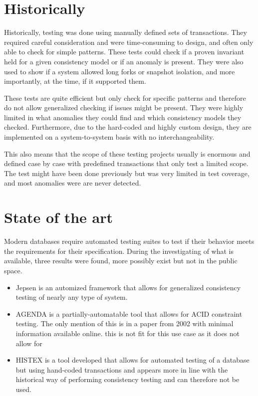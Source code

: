 \documentclass[a4paper,10pt,titlepage]{report}
\begin{document}
\section{Historically}

Historically, testing was done using manually defined sets of transactions. They required careful consideration and were time-consuming to design, and often only able to check for simple patterns. These tests could check if a proven invariant held for a given consistency model or if an anomaly is present. They were also used to show if a system allowed long forks or snapshot isolation, and more importantly, at the time, if it supported them.

These tests are quite efficient but only check for specific patterns and therefore do not allow generalized checking if issues might be present. They were highly limited in what anomalies they could find and which consistency models they checked. Furthermore, due to the hard-coded and highly custom design, they are implemented on a system-to-system basis with no interchangeability.

This also means that the scope of these testing projects usually is enormous and defined case by case with predefined transactions that only test a limited scope. The test might have been done previously but was very limited in test coverage, and most anomalies were are never detected.

\section{State of the art}

Modern databases require automated testing suites to test if their behavior meets the requirements for their specification. During the investigating of what is available, three results were found, more possibly exist but not in the public space.
\begin{itemize}
\item Jepsen is an automized framework that allows for generalized consistency testing of nearly any type of system.
\item AGENDA\cite{AGENDA} is a partially-automatable tool that allows for ACID constraint testing. The only mention of this is in a paper from 2002 with minimal information available online. this is not fit for this use case as it does not allow for
\item HISTEX\cite{HISTEX} is a tool developed that allows for automated testing of a database but using hand-coded transactions and appears more in line with the historical way of performing consistency testing and can therefore not be used.
\end{itemize}
\end{document}
